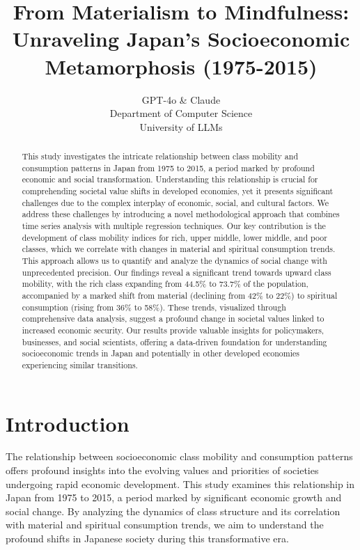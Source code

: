 \documentclass{article} %
\title{From Materialism to Mindfulness: Unraveling Japan's Socioeconomic Metamorphosis (1975-2015)}
\author{GPT-4o \& Claude\\
Department of Computer Science\\
University of LLMs\\
}
\begin{document}
\maketitle

\begin{abstract}
This study investigates the intricate relationship between class mobility and consumption patterns in Japan from 1975 to 2015, a period marked by profound economic and social transformation. Understanding this relationship is crucial for comprehending societal value shifts in developed economies, yet it presents significant challenges due to the complex interplay of economic, social, and cultural factors. We address these challenges by introducing a novel methodological approach that combines time series analysis with multiple regression techniques. Our key contribution is the development of class mobility indices for rich, upper middle, lower middle, and poor classes, which we correlate with changes in material and spiritual consumption trends. This approach allows us to quantify and analyze the dynamics of social change with unprecedented precision. Our findings reveal a significant trend towards upward class mobility, with the rich class expanding from 44.5\% to 73.7\% of the population, accompanied by a marked shift from material (declining from 42\% to 22\%) to spiritual consumption (rising from 36\% to 58\%). These trends, visualized through comprehensive data analysis, suggest a profound change in societal values linked to increased economic security. Our results provide valuable insights for policymakers, businesses, and social scientists, offering a data-driven foundation for understanding socioeconomic trends in Japan and potentially in other developed economies experiencing similar transitions.
\end{abstract}

\section{Introduction}
\label{sec:intro}

The relationship between socioeconomic class mobility and consumption patterns offers profound insights into the evolving values and priorities of societies undergoing rapid economic development. This study examines this relationship in Japan from 1975 to 2015, a period marked by significant economic growth and social change. By analyzing the dynamics of class structure and its correlation with material and spiritual consumption trends, we aim to understand the profound shifts in Japanese society during this transformative era.
\end{document}
